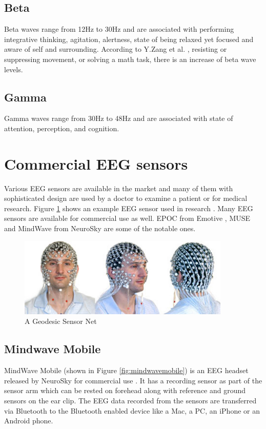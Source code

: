     \subsection{Beta}
    	Beta waves range from 12Hz to 30Hz and are associated with performing integrative thinking, agitation, alertness, state of being relaxed yet focused and aware of self and surrounding. According to Y.Zang et al. \cite{YanZhang}, resisting or suppressing movement, or solving a math task, there is an increase of beta wave levels.
    
    \subsection{Gamma}
    	Gamma waves range from 30Hz to 48Hz and are associated with state of attention, perception, and cognition.

    \section{Commercial EEG sensors}
    \label{Commercial EEG sensors}
    Various EEG sensors are available in the market and many of them with sophisticated design are used by a doctor to examine a patient or for medical research. Figure \ref{fig:eeg_mesh} shows an example EEG sensor used in research \cite{EEGmesh}. Many EEG sensors are available for commercial use as well. EPOC from Emotive \cite{Emotive}, MUSE \cite{muse} and MindWave from NeuroSky \cite{MWMobile} are some of the notable ones.
    
	\begin{figure}[hbtp]
    	\centering
    	\includegraphics[width=0.9\textwidth]{Chapter-2/EEG_mesh}
    	\caption{A Geodesic Sensor Net \cite{EEGmesh}}
    	\label{fig:eeg_mesh}
  	\end{figure}
  
    	\subsection{Mindwave Mobile}
        	MindWave Mobile (shown in Figure \ref{fig:mindwavemobile}) is an EEG headset released by NeuroSky for commercial use \cite{MWMobile}. It has a recording sensor as part of the sensor arm which can be rested on forehead along with reference and ground sensors on the ear clip. The EEG data recorded from the sensors are transferred via Bluetooth to the Bluetooth enabled device like a Mac, a PC, an iPhone or an Android phone.
            
